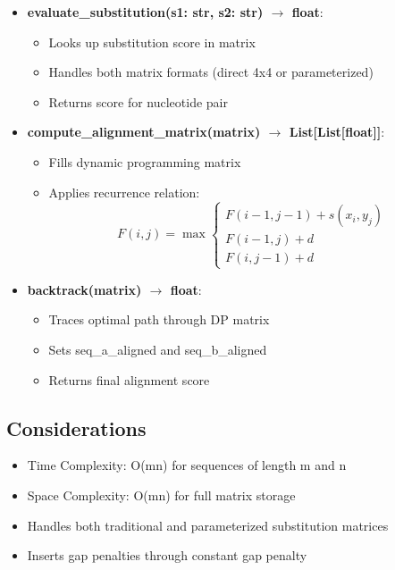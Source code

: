 \documentclass[12pt, titlepage]{article}
\begin{document}
\begin{itemize}
    \item \textbf{evaluate\_substitution(s1: str, s2: str) $\rightarrow$ float}:
    \begin{itemize}
        \item Looks up substitution score in matrix
        \item Handles both matrix formats (direct 4x4 or parameterized)
        \item Returns score for nucleotide pair
    \end{itemize}
    
    \item \textbf{compute\_alignment\_matrix(matrix) $\rightarrow$ List[List[float]]}:
    \begin{itemize}
        \item Fills dynamic programming matrix
        \item Applies recurrence relation:
        \begin{equation}
            F(i,j) = \max\begin{cases}
                F(i-1,j-1) + s(x_i,y_j) \\
                F(i-1,j) + d \\
                F(i,j-1) + d
            \end{cases}
        \end{equation}
    \end{itemize}
    
    \item \textbf{backtrack(matrix) $\rightarrow$ float}:
    \begin{itemize}
        \item Traces optimal path through DP matrix
        \item Sets seq\_a\_aligned and seq\_b\_aligned
        \item Returns final alignment score
    \end{itemize}
\end{itemize}

\subsection{Considerations}

\begin{itemize}
    \item Time Complexity: O(mn) for sequences of length m and n
    \item Space Complexity: O(mn) for full matrix storage
    \item Handles both traditional and parameterized substitution matrices
    \item Inserts gap penalties through constant gap penalty
\end{itemize}
\end{document}
